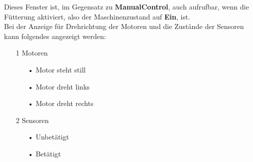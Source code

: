 \vspace{10pt}

Dieses Fenster ist, im Gegensatz zu \textbf{ManualControl}, auch aufrufbar, wenn die Fütterung aktiviert, also der Maschinenzustand auf \textbf{Ein}, ist.
\\ Bei der Anzeige für Drehrichtung der Motoren und die Zustände der Sensoren kann folgendes angezeigt werden:
\begin{itemize}
\item[1] Motoren
  \begin{itemize}
    \item[•] Motor steht still
    \item[•] Motor dreht links
    \item[•] Motor dreht rechts
  \end{itemize}
\item[2] Sensoren
  \begin{itemize}
    \item[•] Unbetätigt 
    \item[•] Betätigt 
  \end{itemize}
\end{itemize}

\vspace{10pt}

